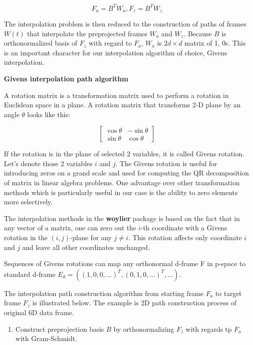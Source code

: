 \[F_a = B^TW_a, F_z = B^TW_z\]

The interpolation problem is then reduced to the construction of paths of frames \(W(t)\) that interpolate the preprojected frames \(W_a\) and \(W_z\). Because \(B\) is orthonormalized basis of \(F_z\) with regard to \(F_a\), \(W_a\) is \(2d\times d\) matrix of 1, 0s. This is an important character for our interpolation algorithm of choice, Givens interpolation.

\textbf{Givens interpolation path algorithm}

A rotation matrix is a transformation matrix used to perform a rotation in Euclidean space in a plane. A rotation matrix that transforms 2-D plane by an angle \(\theta\) looks like this:

\[ \begin{bmatrix}\cos \theta &-\sin \theta \\\sin \theta &\cos \theta \end{bmatrix} \]

If the rotation is in the plane of selected 2 variables, it is called Givens rotation. Let's denote those 2 variables \(i\) and \(j\). The Givens rotation is useful for introducing zeros on a grand scale and used for computing the QR decomposition of matrix in linear algebra problems. One advantage over other transformation methods which is particularly useful in our case is the ability to zero elements more selectively.

The interpolation methods in the \textbf{woylier} package is based on the fact that in any vector of a matrix, one can zero out the \(i\)-th coordinate with a Givens rotation in the \((i, j)\)-plane for any \(j\neq i\). This rotation affects only coordinate \(i\) and \(j\) and leave all other coordinates unchanged.

Sequences of Givens rotations can map any orthonormal d-frame F in p-space to standard d-frame \(E_d=((1, 0, 0, ...)^T, (0, 1, 0, ...)^T, ...)\).

The interpolation path construction algorithm from starting frame \(F_a\) to target frame \(F_z\) is illustrated below. The example is 2D path construction process of original 6D data frame.

\begin{enumerate}
\def\labelenumi{\arabic{enumi}.}
\tightlist
\item
  Construct preprojection basis \(B\) by orthonormalizing \(F_z\) with regards tp \(F_a\) with Gram-Schmidt.
\end{enumerate}

